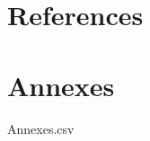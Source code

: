 \documentclass{article}%
\begin{document}
%
\cleardoublepage%
\newpage%
\section*{References}%
\label{sec:References}%
\printbibliography[heading=none]

%
%
\cleardoublepage%
\newpage%
\section*{Annexes}%
\label{sec:Annexes}%
Annexes.csv%
\linebreak

%
%
\cleardoublepage%
\end{document}
